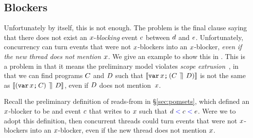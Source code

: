 \subsection{Blockers}
\label{app:blockers}

Unfortunately by itself, this is not enough. The problem is the final
clause saying that there does not exist an $x$-\emph{blocking}
event $c$ between $d$ and $e$. Unfortunately, concurrency can
turn events that were not $x$-blockers into an $x$-blocker,
\emph{even if the new thread does not mention $x$.}
We give an example to show this in .
This is a problem in that it means the preliminary model violates
\emph{scope extrusion}~\cite{Milner:1999:CMS:329902},
in that we can find programs $C$ and $D$ such that
$\llbracket\texttt{var}\,x\texttt{;}\,(C\,\mathbin{\rrceil}\,D)\rrbracket$ is not the same as
$\llbracket(\texttt{var}\,x\texttt{;}\,C)\,\mathbin{\rrceil}\,D\rrbracket$, even if $D$ does not mention~$x$.

Recall the preliminary definition of reads-from in \S\ref{sec:pomsets}, which
defined an $x$-blocker to be and event $c$ that writes to $x$ such that
$d \mathrel{{\color{blue}<}} c \mathrel{{\color{blue}<}} e$.  Were we to adopt this definition, then concurrent
threads could turn events that were not $x$-blockers into an
$x$-blocker, even if the new thread does not mention $x$.

